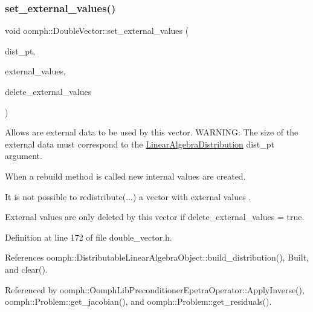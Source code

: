 \subsubsection{\texorpdfstring{set\+\_\+external\+\_\+values()}{set\_external\_values()}\hspace{0.1cm}{\footnotesize\ttfamily [1/2]}}
{\footnotesize\ttfamily void oomph\+::\+Double\+Vector\+::set\+\_\+external\+\_\+values (\begin{DoxyParamCaption}\item[{const \hyperlink{classoomph_1_1LinearAlgebraDistribution}{Linear\+Algebra\+Distribution} $\ast$const \&}]{dist\+\_\+pt,  }\item[{double $\ast$}]{external\+\_\+values,  }\item[{bool}]{delete\+\_\+external\+\_\+values }\end{DoxyParamCaption})\hspace{0.3cm}{\ttfamily [inline]}}



Allows are external data to be used by this vector. W\+A\+R\+N\+I\+NG\+: The size of the external data must correspond to the \hyperlink{classoomph_1_1LinearAlgebraDistribution}{Linear\+Algebra\+Distribution} dist\+\_\+pt argument. 


\begin{DoxyEnumerate}
\item When a rebuild method is called new internal values are created.
\item It is not possible to redistribute(...) a vector with external values .
\item External values are only deleted by this vector if delete\+\_\+external\+\_\+values = true. 
\end{DoxyEnumerate}

Definition at line 172 of file double\+\_\+vector.\+h.



References oomph\+::\+Distributable\+Linear\+Algebra\+Object\+::build\+\_\+distribution(), Built, and clear().



Referenced by oomph\+::\+Oomph\+Lib\+Preconditioner\+Epetra\+Operator\+::\+Apply\+Inverse(), oomph\+::\+Problem\+::get\+\_\+jacobian(), and oomph\+::\+Problem\+::get\+\_\+residuals().

\mbox{\label{classoomph_1_1DoubleVector_a0626a448c259a12bd2b7d50f92da91e3}} 
